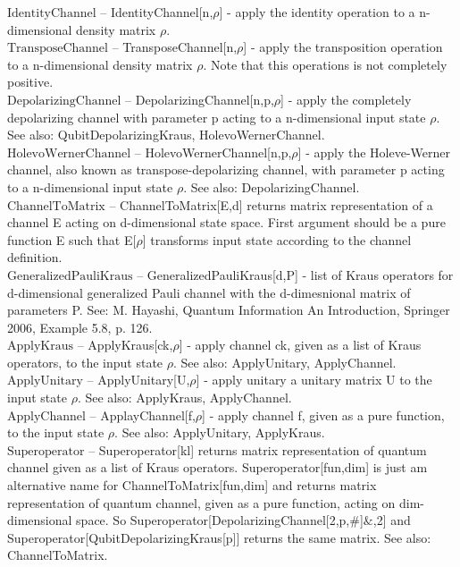 \documentclass[a4paper,10pt]{scrartcl}
\begin{document}
\noindent\textbf{$ \text{IdentityChannel} $ }-- IdentityChannel[n,$\rho $] - apply the identity operation to a n-dimensional density matrix $\rho $.$  $\\[8pt]
\noindent\textbf{$ \text{TransposeChannel} $ }-- TransposeChannel[n,$\rho $] - apply the transposition operation to a n-dimensional density matrix $\rho $. Note that this operations is not completely positive.$  $\\[8pt]
\noindent\textbf{$ \text{DepolarizingChannel} $ }-- DepolarizingChannel[n,p,$\rho $] - apply the completely depolarizing channel with parameter p acting to a n-dimensional input state $\rho $. See also: QubitDepolarizingKraus, HolevoWernerChannel.$  $\\[8pt]
\noindent\textbf{$ \text{HolevoWernerChannel} $ }-- HolevoWernerChannel[n,p,$\rho $] - apply the Holeve-Werner channel, also known as transpose-depolarizing channel, with parameter p acting to a n-dimensional input state $\rho $. See also: DepolarizingChannel.$  $\\[8pt]
\noindent\textbf{$ \text{ChannelToMatrix} $ }-- ChannelToMatrix[E,d] returns matrix representation of a channel E acting on d-dimensional state space. First argument should be a pure function E such that E[$\rho $] transforms input state according to the channel definition.$  $\\[8pt]
\noindent\textbf{$ \text{GeneralizedPauliKraus} $ }-- GeneralizedPauliKraus[d,P] - list of Kraus operators for d-dimensional generalized Pauli channel with the d-dimesnional matrix of parameters P. See: M. Hayashi, Quantum Information An Introduction, Springer 2006, Example 5.8, p. 126.$  $\\[8pt]
\noindent\textbf{$ \text{ApplyKraus} $ }-- ApplyKraus[ck,$\rho $] - apply channel ck, given as a list of Kraus operators, to the input state $\rho $. See also: ApplyUnitary, ApplyChannel.$  $\\[8pt]
\noindent\textbf{$ \text{ApplyUnitary} $ }-- ApplyUnitary[U,$\rho $] - apply unitary a unitary matrix U to the input state $\rho $. See also: ApplyKraus, ApplyChannel.$  $\\[8pt]
\noindent\textbf{$ \text{ApplyChannel} $ }-- ApplayChannel[f,$\rho $] - apply channel f, given as a pure function, to the input state $\rho $. See also: ApplyUnitary, ApplyKraus.$  $\\[8pt]
\noindent\textbf{$ \text{Superoperator} $ }-- Superoperator[kl] returns matrix representation of quantum channel given as a list of Kraus operators. Superoperator[fun,dim] is just am alternative name for ChannelToMatrix[fun,dim] and returns matrix representation of quantum channel, given as a pure function, acting on dim-dimensional space. So Superoperator[DepolarizingChannel[2,p,$\#$]$\&$,2] and Superoperator[QubitDepolarizingKraus[p]] returns the same matrix. See also: ChannelToMatrix.$  $\\[8pt]
\end{document}
